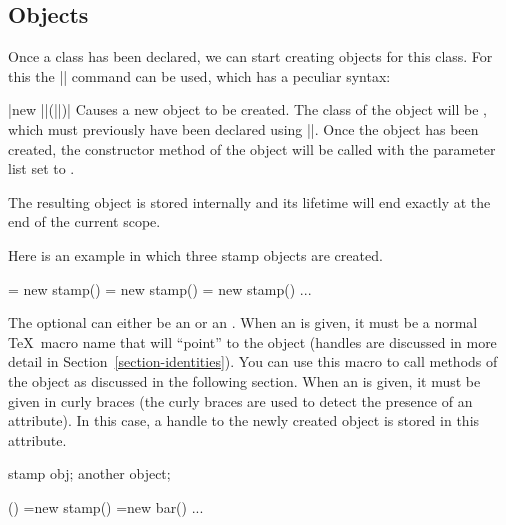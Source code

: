 \subsection{Objects}

Once a class has been declared, we can start creating objects for this
class. For this the |\pgfoonew| command can be used, which has a
peculiar syntax:

\begin{command}{\pgfoonew{}|new ||(||)|}
  Causes a new object to be created. The class of the object will be
  , which must previously have been declared using
  |\pgfooclass|. Once the object has been created, the constructor
  method of the object will be called with the parameter list set to
  .

  The resulting object is stored internally and its lifetime will
  end exactly at the end of the current scope.

  Here is an example in which three stamp objects are created.
\begin{codeexample}
\pgfoonew \firststamp  = new stamp()
\pgfoonew \secondstamp = new stamp()
{
  \pgfoonew \thirdstamp = new stamp()
  ...
}
\end{codeexample}

  The optional  can either be an
   or an . When an  is given, it must be a normal \TeX\ macro name that will
  ``point'' to the object (handles are discussed in more detail in
  Section~\ref{section-identities}). You can use this macro to call
  methods of the object as discussed in the following section. When an
   is given, it must be given in curly braces (the
  curly braces are used to detect the presence of an attribute). In
  this case, a handle to the newly created object is stored in this
  attribute.
\begin{codeexample}
{
  \attribute stamp obj;
  \attribute another object;

  \method \foo() {
    =new stamp()
    =new bar()
  }
  ...
}
\end{codeexample}
\end{command}

